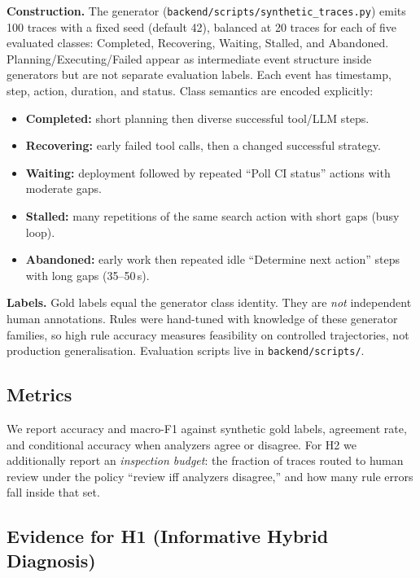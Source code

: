 \documentclass[conference]{IEEEtran}
\begin{document}
\textbf{Construction.} The generator
(\texttt{backend/scripts/synthetic\_traces.py}) emits 100 traces with a fixed seed
(default 42), balanced at 20 traces for each of five evaluated classes: Completed,
Recovering, Waiting, Stalled, and Abandoned. Planning/Executing/Failed appear as
intermediate event structure inside generators but are not separate evaluation labels.
Each event has timestamp, step, action, duration, and status. Class semantics are
encoded explicitly:

\begin{itemize}
\item \textbf{Completed:} short planning then diverse successful tool/LLM steps.
\item \textbf{Recovering:} early failed tool calls, then a changed successful strategy.
\item \textbf{Waiting:} deployment followed by repeated ``Poll CI status'' actions with
      moderate gaps.
\item \textbf{Stalled:} many repetitions of the same search action with short gaps
      (busy loop).
\item \textbf{Abandoned:} early work then repeated idle ``Determine next action'' steps
      with long gaps (35--50\,s).
\end{itemize}

\textbf{Labels.} Gold labels equal the generator class identity. They are \emph{not}
independent human annotations. Rules were hand-tuned with knowledge of these generator
families, so high rule accuracy measures feasibility on controlled trajectories, not
production generalisation. Evaluation scripts live in \texttt{backend/scripts/}.

\subsection{Metrics}

We report accuracy and macro-F1 against synthetic gold labels, agreement rate, and
conditional accuracy when analyzers agree or disagree. For H2 we additionally report an
\emph{inspection budget}: the fraction of traces routed to human review under the policy
``review iff analyzers disagree,'' and how many rule errors fall inside that set.

\subsection{Evidence for H1 (Informative Hybrid Diagnosis)}
\end{document}
